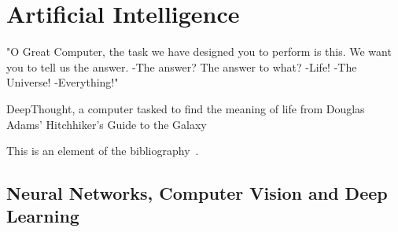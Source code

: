 \section{Artificial Intelligence}
\epigraph{"O Great Computer, the task we have designed you to perform is this. We want you to tell us the answer. -The answer? The answer to what? -Life! -The Universe! -Everything!"}{DeepThought, a computer tasked to find the meaning of life from Douglas Adams' Hitchhiker's Guide to the Galaxy}

This is an element of the bibliography~\cite{2022}.
\subsection{Neural Networks, Computer Vision and Deep Learning}